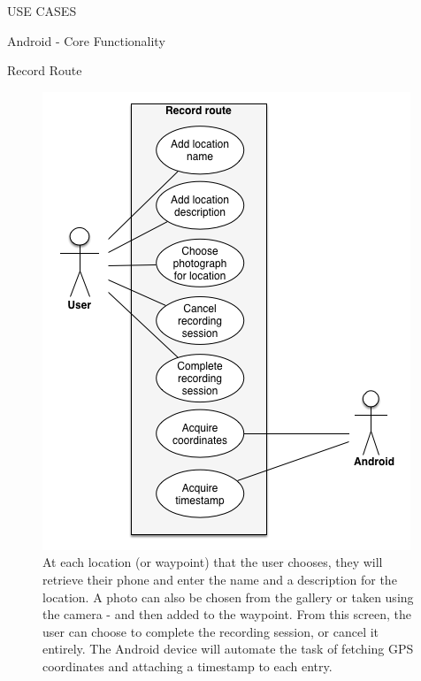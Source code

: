 \documentclass{article}
\begin{document}
\begin{section}{USE CASES}
\begin{subsection}{Android - Core Functionality}
			\clearpage
			\begin{subsubsection}{Record Route}
				\begin{figure}[h!]
					\begin{center}
						\includegraphics[height=0.75\columnwidth]{images/UseCase/Android/Core/RecordRoute.png}
					\end{center}
					\caption{At each location (or waypoint) that the user chooses, they will retrieve their phone and enter the name and a description for the location. A photo can also be chosen from the gallery or taken using the camera - and then added to the waypoint. From this screen, the user can choose to complete the recording session, or cancel it entirely. The Android device will automate the task of fetching GPS coordinates and attaching a timestamp to each entry.}
				\end{figure}
			\end{subsubsection}
			

\end{subsection}
\end{section}
\end{document}
